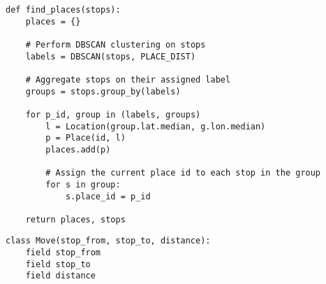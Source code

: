 \begin{verbatim}
def find_places(stops):
    places = {}
    
    # Perform DBSCAN clustering on stops
    labels = DBSCAN(stops, PLACE_DIST)
    
    # Aggregate stops on their assigned label
    groups = stops.group_by(labels)
    
    for p_id, group in (labels, groups)
        l = Location(group.lat.median, g.lon.median)
        p = Place(id, l)
        places.add(p)
        
        # Assign the current place id to each stop in the group
        for s in group:
            s.place_id = p_id
    
    return places, stops
\end{verbatim}
\begin{verbatim}
class Move(stop_from, stop_to, distance):
    field stop_from
    field stop_to
    field distance
\end{verbatim}



        
        


